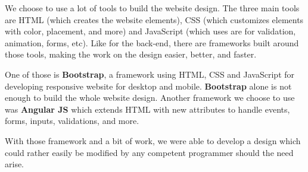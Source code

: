 We choose to use a lot of tools to build the website design. The three main tools are HTML
(which creates the website elements), CSS (which customizes elements with color, placement,
and more) and JavaScript (which uses are for validation, animation, forms, etc). Like for
the back-end, there are frameworks built around those tools, making the work on the design
easier, better, and faster. \newline

One of those is \textbf{Bootstrap}, a framework using HTML, CSS and JavaScript for
developing responsive website for desktop and mobile. \textbf{Bootstrap} alone is not enough
to build the whole website design. Another framework we choose to use was \textbf{Angular
JS} which extends HTML with new attributes to handle events, forms, inputs, validations, and
more.\newline

With those framework and a bit of work, we were able to develop a design which could rather
easily be modified by any competent programmer should the need arise.
